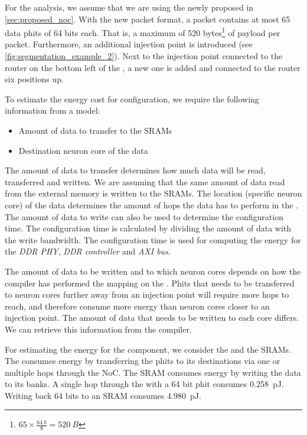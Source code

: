 For the analysis, we assume that we are using the newly proposed \confignoc{} in \cref{sec:proposed_noc}. 
With the new packet format, a packet contains at most 65 data phits of 64 bits each.
That is, a maximum of 520 bytes\footnote{$65 \times \frac{\SI{64}{b}}{8} = \SI{520}{B}$} of payload per packet.
Furthermore, an additional injection point is introduced (see \cref{fig:segmentation_example_2}).
Next to the injection point connected to the router on the bottom left of the \confignoc{}, a new one is added and connected to the router six positions up.

To estimate the energy cost for configuration, we require the following information from a model:
\begin{itemize}
    \item Amount of data to transfer to the SRAMs
    \item Destination neuron core of the data
\end{itemize}

The amount of data to transfer determines how much data will be read, transferred and written.
We are assuming that the same amount of data read from the external memory is written to the SRAMs.
The location (specific neuron core) of the data determines the amount of hops the data has to perform in the \confignoc{}.
The amount of data to write can also be used to determine the configuration time.
The configuration time is calculated by dividing the amount of data with the write bandwidth.
The configuration time is used for computing the energy for the \textit{DDR PHY}, \textit{DDR controller} and \textit{AXI bus}.

The amount of data to be written and to which neuron cores depends on how the compiler has performed the mapping on the \graicore{}. %
Phits that needs to be transferred to neuron cores further away from an injection point will require more hops to reach, and therefore consume more energy than neuron cores closer to an injection point.
The amount of data that needs to be written to each core differs.
We can retrieve this information from the compiler.

For estimating the energy for the \graicore{} component, we consider the \confignoc{} and the SRAMs.
The \confignoc{} consumes energy by transferring the phits to its destinations via one or multiple hops through the NoC.
The SRAM consumes energy by writing the data to its banks.
A single hop through the \confignoc{} with a 64 bit phit consumes \SI{0.258}{pJ}.
Writing back 64 bits to an SRAM consumes \SI{4.980}{pJ}.

